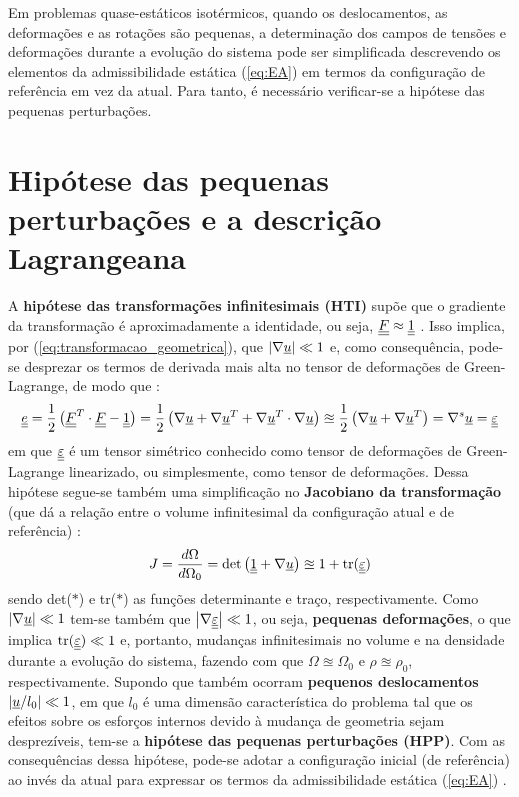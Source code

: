 Em problemas quase-estáticos isotérmicos, quando os deslocamentos, as deformações e as rotações são pequenas, a determinação dos campos de tensões e deformações durante a evolução do sistema pode ser simplificada descrevendo os elementos da admissibilidade estática (\ref{eq:EA}) em termos da configuração de referência em vez da atual. Para tanto, é necessário verificar-se a hipótese das pequenas perturbações.

\section{Hipótese das pequenas perturbações e a descrição Lagrangeana}

A \textbf{hipótese das transformações infinitesimais (HTI)} supõe que o gradiente da transformação é aproximadamente a identidade, ou seja, $\underline{\underline F} \approx \underline{\underline 1}$ . Isso implica, por (\ref{eq:transformacao_geometrica}), que $\left| \nabla \underline u \right| \ll 1$ e, como consequência, pode-se desprezar os termos de derivada mais alta no tensor de deformações de Green-Lagrange, de modo que \cite[p. 57]{Salencon2001}:
\begin{equation}
	\label{eq:green_lagrange_linearizado}
	\underline{\underline e} = \frac{1}{2} \left(\underline{\underline F}^T \cdot \underline{\underline F} - \underline{\underline 1} \right) = \frac{1}{2} \left(\nabla \underline u + \nabla\underline u^T + \nabla\underline u^T \cdot \nabla \underline u \right) \approxeq \frac{1}{2} \left(\nabla \underline u + \nabla\underline u^T \right) = \nabla^s\underline u = \underline{\underline \varepsilon}
\end{equation}
em que $\underline{\underline \varepsilon}$ é um tensor simétrico conhecido como tensor de deformações de Green-Lagrange linearizado, ou simplesmente, como tensor de deformações. Dessa hipótese segue-se também uma simplificação no \textbf{Jacobiano da transformação} (que dá a relação entre o volume infinitesimal da configuração atual e de referência) \cite[p. 58]{Salencon2001}:
\begin{equation}
	\label{eq:jacobiano}
	J = \frac{d\Omega}{d\Omega_0} = \text{det}\left(\underline{\underline 1} + \nabla \underline u \right) \approxeq 1 + \text{tr}(\underline{\underline \varepsilon})
\end{equation}
sendo det($*$) e tr($*$) as funções determinante e traço, respectivamente. Como  $\left| \nabla \underline u \right| \ll 1$ tem-se também que $\left| \nabla \underline{\underline \varepsilon} \right| \ll 1$, ou seja, \textbf{pequenas deformações}, o que implica $\text{tr}(\underline{\underline \varepsilon}) \ll 1$ e, portanto, mudanças infinitesimais no volume e na densidade durante a evolução do sistema, fazendo com que $\Omega \approxeq \Omega_0$ e $\rho \approxeq \rho_0$, respectivamente. Supondo que também ocorram \textbf{pequenos deslocamentos} $\left| \underline u / l_0 \right| \ll 1$, em que $l_0$ é uma dimensão característica do problema tal que os efeitos sobre os esforços internos devido à mudança de geometria sejam desprezíveis, tem-se a \textbf{hipótese das pequenas perturbações (HPP)}. Com as consequências dessa hipótese, pode-se adotar a configuração inicial (de referência) ao invés da atual para expressar os termos da admissibilidade estática  (\ref{eq:EA}) \cite[p. 376-379]{Salencon2001}.

